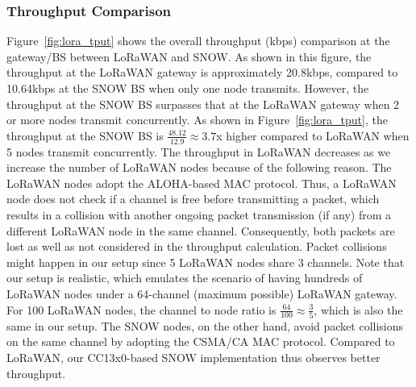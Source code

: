 \subsubsection{Throughput Comparison}
Figure~\ref{fig:lora_tput} shows the overall throughput (kbps) comparison at the gateway/BS between LoRaWAN and SNOW. As shown in this figure, the throughput at the LoRaWAN gateway is approximately 20.8kbps, compared to 10.64kbps at the SNOW BS when only one node transmits. However, the throughput at the SNOW BS surpasses that at the LoRaWAN gateway when 2 or more nodes transmit concurrently. As shown in Figure~\ref{fig:lora_tput}, the throughput at the SNOW BS is $\frac{48.12}{12.9} \approx 3.7$x higher compared to LoRaWAN when 5 nodes transmit concurrently. The throughput in LoRaWAN decreases as we increase the number of LoRaWAN nodes because of the following reason. The LoRaWAN nodes adopt the ALOHA-based MAC protocol. Thus, a LoRaWAN node does not check if a channel is free before transmitting a packet, which results in a collision with another ongoing packet transmission (if any) from a different LoRaWAN node in the same channel. Consequently, both packets are lost as well as not considered in the throughput calculation.
Packet collisions might happen in our setup since 5 LoRaWAN nodes share 3 channels. Note that our setup is realistic, which emulates the scenario of having hundreds of LoRaWAN nodes under a 64-channel (maximum possible) LoRaWAN gateway. For 100 LoRaWAN nodes, the channel to node ratio is $\frac{64}{100} \approx \frac{3}{5}$, which is also the same in our setup. The SNOW nodes, on the other hand, avoid packet collisions on the same channel by adopting the CSMA/CA MAC protocol.
Compared to LoRaWAN, our CC13x0-based SNOW implementation thus observes better throughput.

